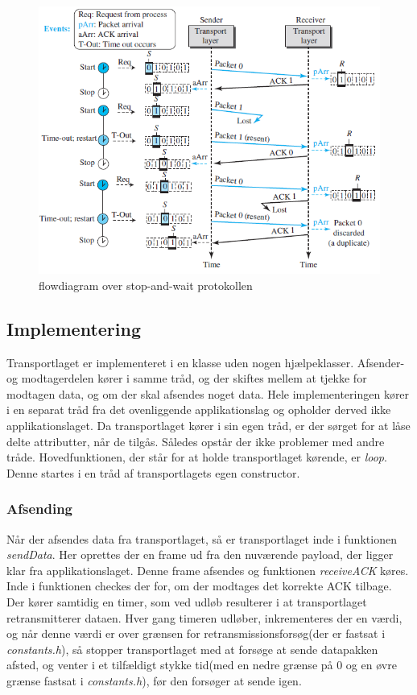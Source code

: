 \begin{figure}[h]
\centering
\includegraphics[scale=0.75]{Billeder/StopAndWaitFlow.png}
\caption{flowdiagram over stop-and-wait protokollen
\label{StopAndWaitFlow}}
\end{figure}

\subsection{Implementering}
Transportlaget er implementeret i en klasse uden nogen hjælpeklasser. Afsender-og modtagerdelen kører i samme tråd, og der skiftes mellem at tjekke for modtagen data, og om der skal afsendes noget data. Hele implementeringen kører i en separat tråd fra det ovenliggende applikationslag og opholder derved ikke applikationslaget. Da transportlaget kører i sin egen tråd, er der sørget for at låse delte attributter, når de tilgås. Således opstår der ikke problemer med andre tråde. Hovedfunktionen, der står for at holde transportlaget kørende, er \textit{loop}. Denne startes i en tråd af transportlagets egen constructor.

\subsubsection{Afsending}
Når der afsendes data fra transportlaget, så er transportlaget inde i funktionen \textit{sendData}. Her oprettes der en frame ud fra den nuværende payload, der ligger klar fra applikationslaget. Denne frame afsendes og funktionen \textit{receiveACK} køres. Inde i funktionen checkes der for, om der modtages det korrekte ACK tilbage. Der kører samtidig en timer, som ved udløb resulterer i at transportlaget retransmitterer dataen. Hver gang timeren udløber, inkrementeres der en værdi, og når denne værdi er over grænsen for retransmissionsforsøg(der er fastsat i \textit{constants.h}), så stopper transportlaget med at forsøge at sende datapakken afsted, og venter i et tilfældigt stykke tid(med en nedre grænse på 0 og en øvre grænse fastsat i \textit{constants.h}), før den forsøger at sende igen.

